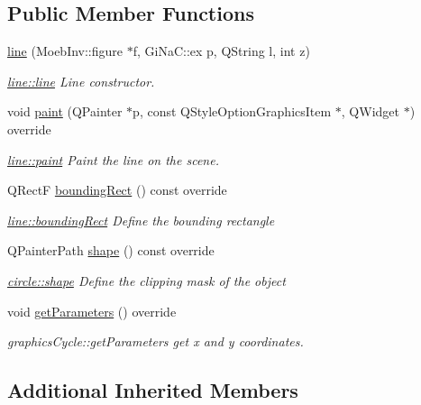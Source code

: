 \subsection*{Public Member Functions}
\begin{DoxyCompactItemize}
\item 
\mbox{\hyperlink{classline_aa3036c81d69da978e5ca41a0ad1b3f73}{line}} (Moeb\+Inv\+::figure $\ast$f, Gi\+Na\+C\+::ex p, Q\+String l, int z)
\begin{DoxyCompactList}\small\item\em \mbox{\hyperlink{classline_aa3036c81d69da978e5ca41a0ad1b3f73}{line\+::line}} Line constructor. \end{DoxyCompactList}\item 
void \mbox{\hyperlink{classline_a5607ea98a22c8625342ad71d17043e1b}{paint}} (Q\+Painter $\ast$p, const Q\+Style\+Option\+Graphics\+Item $\ast$, Q\+Widget $\ast$) override
\begin{DoxyCompactList}\small\item\em \mbox{\hyperlink{classline_a5607ea98a22c8625342ad71d17043e1b}{line\+::paint}} Paint the line on the scene. \end{DoxyCompactList}\item 
Q\+RectF \mbox{\hyperlink{classline_a025bc6bd205ea62d0c065acba70e2b97}{bounding\+Rect}} () const override
\begin{DoxyCompactList}\small\item\em \mbox{\hyperlink{classline_a025bc6bd205ea62d0c065acba70e2b97}{line\+::bounding\+Rect}} Define the bounding rectangle \end{DoxyCompactList}\item 
Q\+Painter\+Path \mbox{\hyperlink{classline_ae9aabb8694d14d941d21843dc0a52811}{shape}} () const override
\begin{DoxyCompactList}\small\item\em \mbox{\hyperlink{classcircle_a198cbcea745bd311fe91c2a23def746c}{circle\+::shape}} Define the clipping mask of the object \end{DoxyCompactList}\item 
void \mbox{\hyperlink{classline_a6453a1483e1cf2ae4f565fd7f80516fc}{get\+Parameters}} () override
\begin{DoxyCompactList}\small\item\em graphics\+Cycle\+::get\+Parameters get x and y coordinates. \end{DoxyCompactList}\end{DoxyCompactItemize}
\subsection*{Additional Inherited Members}


